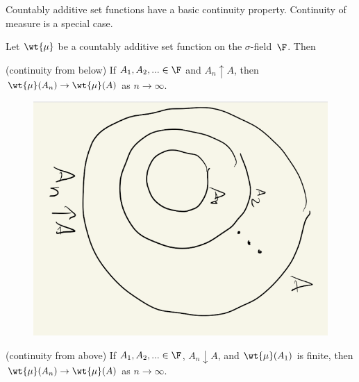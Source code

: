 \documentclass{article} %
\renewcommand{\sf}{$\sigma$-field}
\newcommand{\signedmu}{\wt{\mu}}
\begin{document}
Countably additive set functions have a basic continuity property. Continuity of measure is a special case. 

\begin{theorem}
Let $\signedmu$ be a countably additive set function on the \sf\ $\F$. Then

\begin{alphabate}
\item (continuity from below) If $A_1, A_2, ... \in \F$ and $A_n \uparrow A$, then $\signedmu(A_n) \to \signedmu(A)$ as $n \to \infty$.

\begin{figure}[H]
 \centering
\includegraphics[width=.2\textwidth, angle=90]{images/increasing_sequence_of_sets}	
 \end{figure}
   
\item (continuity from above)  If $A_1, A_2, ... \in \F$, $A_n \downarrow A$, and $\signedmu(A_1)$ is finite, then $\signedmu(A_n) \to \signedmu(A)$ as $n \to \infty$. 
\end{alphabate}
\label{thm:continuity_of_countably_additive_set_functions}
\end{theorem}
\end{document}
